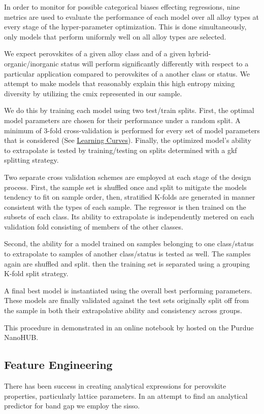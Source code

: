 \documentclass[aip, jmp, amsmath, amssymb, nofootinbib]{revtex4-2}
\begin{document}
In order to monitor for possible categorical biases effecting
regressions, nine metrics are used to evaluate the performance of each
model over all alloy types at every stage of the hyper-parameter
optimization. This is done simultaneously, only models that perform
uniformly well on all alloy types are selected.

We expect perovskites of a given alloy class and of a given
hybrid-organic/inorganic status will perform significantly differently
with respect to a particular application compared to perovskites of a
another class or status. We attempt to make models that reasonably
explain this high entropy mixing diversity by utilizing the \gls{cmix} represented in our sample.

We do this by training each model using two test/train splits. First,
the optimal model parameters are chosen for their performance under a
random split. A minimum of 3-fold cross-validation is performed for
every set of model parameters that is considered (See \hyperref[sec:org8a7016b]{Learning Curves}). Finally, the optimized model's ability to extrapolate is
tested by training/testing on splits determined with a \gls{gkf} splitting strategy.

Two separate cross validation schemes are employed at each stage of
the design process. First, the sample set is shuffled once and split
to mitigate the models tendency to fit on sample order, then,
stratified K-folds are generated in manner consistent with the types
of each sample. The regressor is then trained on the subsets of each
class. Its ability to extrapolate is independently metered on each
validation fold consisting of members of the other classes.

Second, the ability for a model trained on samples belonging to one
class/status to extrapolate to samples of another class/status is
tested as well. The samples again are shuffled and split. then the
training set is separated using a grouping K-fold split strategy.

A final best model is instantiated using the overall best performing
parameters. These models are finally validated against the test sets
originally split off from the sample in both their extrapolative
ability and consistency across groups.

This procedure in demonstrated in an online notebook by
\citet{manganaris-2022-mrs-comput} hosted on the Purdue NanoHUB.

\subsection*{Feature Engineering}
\label{sec:orge549945}
There has been success in creating analytical expressions for
perovskite properties, particularly lattice
parameters\cite{jiang-2006-predic-lattic}. In an attempt to find an
analytical predictor for band gap we employ the \Acrfull{sisso}\cite{ouyang-2018-sisso}.
\end{document}
